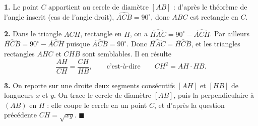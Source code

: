 \textbf{1.} Le point $C$ appartient au cercle de diamètre $[AB]$ :
d'après le théorème de l'angle inscrit (cas de l'angle droit),
$\widehat{ACB} = 90^\circ$, donc $ABC$ est rectangle en $C$.

\medskip

\textbf{2.} Dans le triangle $ACH$, rectangle en $H$, on a
$\widehat{HAC} = 90^\circ - \widehat{ACH}$. Par ailleurs
$\widehat{HCB} = 90^\circ - \widehat{ACH}$ puisque
$\widehat{ACB} = 90^\circ$. Donc $\widehat{HAC} = \widehat{HCB}$, et
les triangles rectangles $AHC$ et $CHB$ sont semblables. Il en résulte
\[
\frac{AH}{CH} = \frac{CH}{HB},
\qquad\text{c'est-à-dire}\qquad
CH^2 = AH \cdot HB.
\]

\medskip

\textbf{3.} On reporte sur une droite deux segments consécutifs
$[AH]$ et $[HB]$ de longueurs $x$ et $y$. On trace le cercle de
diamètre $[AB]$, puis la perpendiculaire à $(AB)$ en $H$ : elle coupe
le cercle en un point $C$, et d'après la question précédente
$CH = \sqrt{xy}$. \hfill $\blacksquare$
